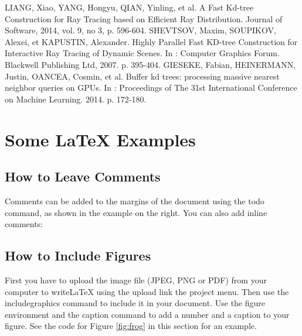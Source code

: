 \documentclass[a4paper]{article}
\begin{document}
\begin{thebibliography}{1}
	 LIANG, Xiao, YANG, Hongyu, QIAN, Yinling, et al. A Fast Kd-tree Construction for Ray Tracing based on Efficient Ray Distribution. Journal of Software, 2014, vol. 9, no 3, p. 596-604.
	 SHEVTSOV, Maxim, SOUPIKOV, Alexei, et KAPUSTIN, Alexander. Highly Parallel Fast KD-tree Construction for Interactive Ray Tracing of Dynamic Scenes. In : Computer Graphics Forum. Blackwell Publishing Ltd, 2007. p. 395-404.
	 GIESEKE, Fabian, HEINERMANN, Justin, OANCEA, Cosmin, et al. Buffer kd trees: processing massive nearest neighbor queries on GPUs. In : Proceedings of The 31st International Conference on Machine Learning. 2014. p. 172-180.
\end{thebibliography}

\section{Some \LaTeX{} Examples}
\label{sec:examples}

\subsection{How to Leave Comments}

Comments can be added to the margins of the document using the  todo command, as shown in the example on the right. You can also add inline comments:


\subsection{How to Include Figures}

First you have to upload the image file (JPEG, PNG or PDF) from your computer to writeLaTeX using the upload link the project menu. Then use the includegraphics command to include it in your document. Use the figure environment and the caption command to add a number and a caption to your figure. See the code for Figure \ref{fig:frog} in this section for an example.

\end{document}
